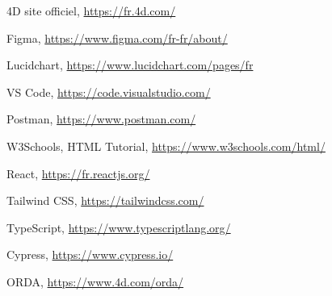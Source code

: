
\begin{thebibliography}{9}
    
    4D site officiel,     
    \href{https://fr.4d.com/}{https://fr.4d.com/}
   
    Figma, 
    \href{https://www.figma.com/fr-fr/about/}{https://www.figma.com/fr-fr/about/}
    
    Lucidchart,
    \href{https://www.lucidchart.com/pages/fr}{https://www.lucidchart.com/pages/fr}
    
    VS Code,
    \href{https://code.visualstudio.com/}{https://code.visualstudio.com/}
    
    Postman,
    \href{https://www.postman.com/}{https://www.postman.com/}
    
    W3Schools, HTML Tutorial,
    \href{https://www.w3schools.com/html/}{https://www.w3schools.com/html/}
    
    React,
    \href{https://fr.reactjs.org/}{https://fr.reactjs.org/}
    
    Tailwind CSS,
    \href{https://tailwindcss.com/}{https://tailwindcss.com/}
    
    TypeScript,
    \href{https://www.typescriptlang.org/}{https://www.typescriptlang.org/}
    
    Cypress,
    \href{https://www.cypress.io/}{https://www.cypress.io/}
    
    ORDA,
    \href{https://www.4d.com/orda/}{https://www.4d.com/orda/}
\end{thebibliography}
